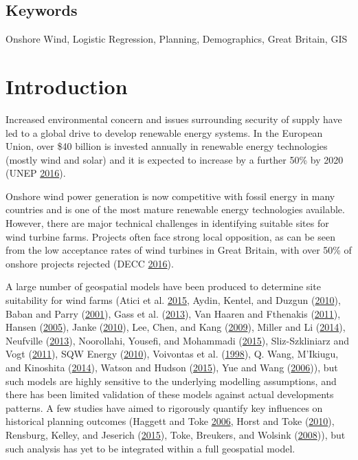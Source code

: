 \documentclass[a4paper,]{article}
\theoremstyle{definition}
\theoremstyle{definition}
\theoremstyle{remark}
\begin{document}
{\subsection*{Keywords}\label{keywords}

Onshore Wind, Logistic Regression, Planning, Demographics, Great
Britain, GIS

\section{Introduction}\label{introduction}

Increased environmental concern and issues surrounding security of
supply have led to a global drive to develop renewable energy systems.
In the European Union, over \$40 billion is invested annually in
renewable energy technologies (mostly wind and solar) and it is expected
to increase by a further 50\% by 2020 (UNEP
\protect\hyperlink{ref-UNEP2016}{2016}).

Onshore wind power generation is now competitive with fossil energy in
many countries and is one of the most mature renewable energy
technologies available. However, there are major technical challenges in
identifying suitable sites for wind turbine farms. Projects often face
strong local opposition, as can be seen from the low acceptance rates of
wind turbines in Great Britain, with over 50\% of onshore projects
rejected (DECC \protect\hyperlink{ref-DECC2016}{2016}).

A large number of geospatial models have been produced to determine site
suitability for wind farms (Atici et al.
\protect\hyperlink{ref-Atici2015}{2015}, Aydin, Kentel, and Duzgun
(\protect\hyperlink{ref-Aydin2010}{2010}), Baban and Parry
(\protect\hyperlink{ref-Baban2001}{2001}), Gass et al.
(\protect\hyperlink{ref-Gass2013}{2013}), Van Haaren and Fthenakis
(\protect\hyperlink{ref-VanHaaren2011}{2011}), Hansen
(\protect\hyperlink{ref-Hansen2005}{2005}), Janke
(\protect\hyperlink{ref-Janke2010}{2010}), Lee, Chen, and Kang
(\protect\hyperlink{ref-Lee2009}{2009}), Miller and Li
(\protect\hyperlink{ref-Miller2014}{2014}), Neufville
(\protect\hyperlink{ref-Neufville2013}{2013}), Noorollahi, Yousefi, and
Mohammadi (\protect\hyperlink{ref-Noorollahi2015}{2015}),
Sliz-Szkliniarz and Vogt
(\protect\hyperlink{ref-Sliz-Szkliniarz2011}{2011}), SQW Energy
(\protect\hyperlink{ref-SQWEnergy2010}{2010}), Voivontas et al.
(\protect\hyperlink{ref-Voivontas1998}{1998}), Q. Wang, M'Ikiugu, and
Kinoshita (\protect\hyperlink{ref-Wang2014}{2014}), Watson and Hudson
(\protect\hyperlink{ref-Watson2015}{2015}), Yue and Wang
(\protect\hyperlink{ref-Yue2006}{2006})), but such models are highly
sensitive to the underlying modelling assumptions, and there has been
limited validation of these models against actual developments patterns.
A few studies have aimed to rigorously quantify key influences on
historical planning outcomes (Haggett and Toke
\protect\hyperlink{ref-Haggett2006}{2006}, Horst and Toke
(\protect\hyperlink{ref-VanderHorst2010}{2010}), Rensburg, Kelley, and
Jeserich (\protect\hyperlink{ref-VanRensburg20}{2015}), Toke, Breukers,
and Wolsink (\protect\hyperlink{ref-Toke2008}{2008})), but such analysis
has yet to be integrated within a full geospatial model.

}
\end{document}
